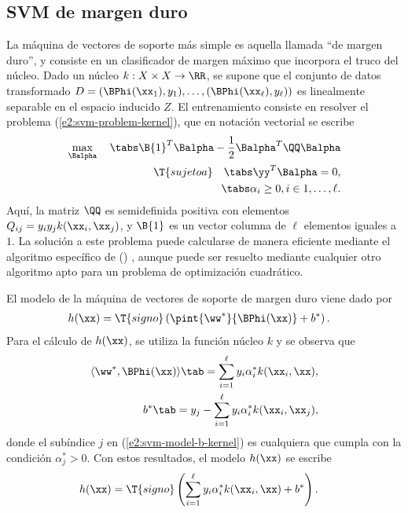 %
%
\subsection{SVM de margen duro}
%
La máquina de vectores de soporte más simple es aquella llamada ``de
margen duro'', y consiste en un clasificador de margen máximo que
incorpora el truco del núcleo.
Dado un núcleo $k:X\times{}X\rightarrow\RR$, se supone que el conjunto
de datos transformado
$D=\left(\BPhi(\xx_1),y_1),\ldots,(\BPhi(\xx_\ell),y_\ell)\right)$ es
linealmente separable en el espacio inducido $Z$.
El entrenamiento consiste en resolver el problema
(\ref{e2:svm-problem-kernel}), que en notación vectorial se escribe
%
\begin{equation}\label{e2:svm-hard-margin}
  \begin{aligned}
    \max_{\Balpha}\quad\tabs
      \B{1}^T\Balpha-\frac{1}{2}\Balpha^T\QQ\Balpha\\
    \T{sujeto a} \quad\tabs
      \yy^T\Balpha = 0, \\
      \tabs \alpha_i\geq 0,  i\in {1,\ldots,\ell }.
  \end{aligned}
\end{equation}
%
Aquí, la matriz $\QQ$ es semidefinida positiva con elementos
$Q_{ij}=y_iy_jk(\xx_i,\xx_j)$, y $\B{1}$ es un vector columna de
$\ell$ elementos iguales a $1$.
La solución a este problema puede calcularse de manera eficiente
mediante el algoritmo específico de 
() \cite{smo}, aunque puede
ser resuelto mediante cualquier otro algoritmo apto para un problema
de optimización cuadrático.

El modelo de la máquina de vectores de soporte de margen duro viene
dado por
%
\begin{align}\label{e2:svm-model-hard0}
    h(\xx) &= \T{signo}\left(\pint{\ww^*}{\BPhi(\xx)}+b^*\right).
\end{align}
%
Para el cálculo de $h(\xx)$, se utiliza la función núcleo $k$ y se
observa que
%
\begin{align}
  \langle\ww^*,\BPhi(\xx)\rangle \tab=
  \sum_{i=1}^\ell{}y_i\alpha^*_ik(\xx_i,\xx),\\
  b^* \tab= y_j - \sum_{i=1}^\ell{}y_i\alpha^*_ik(\xx_i,\xx_j),
  \label{e2:svm-model-b-kernel}
\end{align}
%
donde el subíndice $j$ en (\ref{e2:svm-model-b-kernel}) es cualquiera
que cumpla con la condición $\alpha^*_j>0$.
Con estos resultados, el modelo $h(\xx)$ se escribe
%
\begin{align}
  h(\xx) &=
  \T{signo}\left(\sum_{i=1}^\ell{}y_i\alpha^*_ik(\xx_i,\xx)+b^*\right).
\label{e2:svm-model-hard}
\end{align}
%
